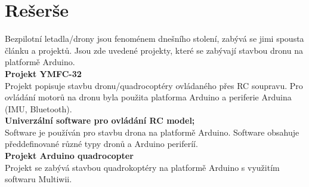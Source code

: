 \chapter{Rešerše}
\label{1-reserse}

Bezpilotní letadla/drony jsou fenoménem dnešního stolení, zabývá se jimi spousta článku a projektů. Jsou zde uvedené projekty, které se zabývají stavbou dronu na platformě Arduino.\\

\textbf{Projekt YMFC-32}\\
Projekt popisuje stavbu dronu/quadrocoptéry ovládaného přes RC soupravu. Pro ovládání motorů na dronu byla použita platforma Arduino a periferie Arduina (IMU, Bluetooth).\\

\textbf{Univerzální software pro ovládání RC model;}\\
Software je používán pro stavbu drona na platformě Arduino. Software obsahuje předdefinované různé typy dronů a Arduino periferíí.\\

\textbf{Projekt Arduino quadrocopter}\\
Projekt se zabývá stavbou quadrokoptéry na platformě Arduino s využitím softwaru  Multiwii.\\

